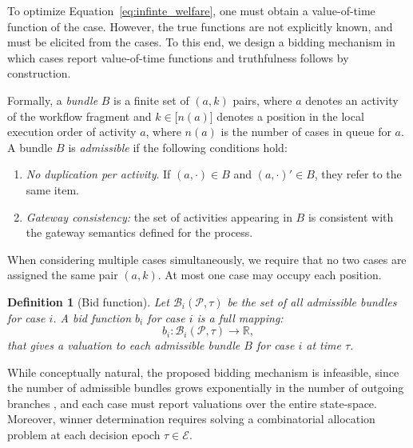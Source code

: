 \documentclass[letterpaper]{article}
\newtheorem{definition}{Definition}
\begin{document}

To optimize Equation~\eqref{eq:infinte_welfare}, 
one must obtain a value-of-time function of the case.
However, the true functions are not explicitly known,
and must be elicited from the cases. 
To this end, we design a bidding mechanism in which cases report value-of-time functions and truthfulness follows by construction.

Formally, a \emph{bundle} $B$ is a finite set of $(a,k)$ pairs, where $a$ denotes an activity
of the workflow fragment and
$k \in \mathbb[n(a)]$ denotes a position in the local execution order of activity $a$, where $n(a)$ is the number of cases in 
 queue for $a$. A bundle $B$ is \emph{admissible} if the following conditions hold:
\begin{enumerate}
    \item \emph{No duplication per activity}.  
    If $(a,\cdot)\in B$ and $(a,\cdot)'\in B$, they refer to the same item.
   \item \emph{Gateway consistency:} the set of activities appearing in $B$ is consistent with the gateway semantics defined for the process.
\end{enumerate}  When considering multiple cases simultaneously, we require that no two cases are assigned the same pair $(a,k)$. At most one case may occupy each position.
\begin{definition}[Bid function]
Let $\mathcal{B}_i(\mathcal{P},\tau)$ be the set of all \emph{admissible bundles} for case $i$. A \emph{bid function} $b_i$ for case $i$ is a full mapping: \[
    b_i:\mathcal{B}_i(\mathcal{P},\tau) \rightarrow \mathbb{R},
\]
that gives a valuation to each admissible bundle $B$ for case $i$ at time $\tau$. 
\end{definition}  
While conceptually natural, the proposed bidding mechanism is infeasible,
since the number of admissible bundles grows
exponentially in the number of outgoing branches \citep{sandholm2002algorithm}, and each case must report valuations over the entire state-space.
Moreover, winner determination requires solving a combinatorial
allocation problem at each decision epoch $\tau\in\mathcal{E}$.
 
\end{document}
